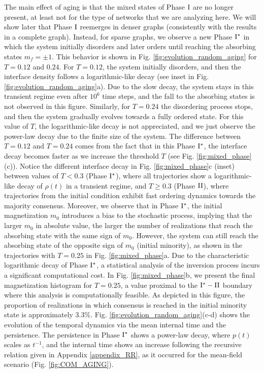 The main effect of aging is that the mixed states of Phase ${\rm I}$ are no longer present, at least not for the type of networks that we are analyzing here. We will show later that Phase ${\rm I}$ reemerges in denser graphs (consistently with the results in a complete graph). Instead, for sparse graphs, we observe a new Phase ${\rm I}^{*}$ in which the system initially disorders and later orders until reaching the absorbing states $m_f = \pm 1$. This behavior is shown in Fig. \ref{fig:evolution_random_aging} for $T = 0.12$ and $0.24$. For $T = 0.12$, the system initially disorders, and then the interface density follows a logarithmic-like decay (see inset in Fig. \ref{fig:evolution_random_aging}a). Due to the slow decay, the system stays in this transient regime even after $10^{6}$ time steps, and the fall to the absorbing states is not observed in this figure. Similarly, for $T = 0.24$ the disordering process stops, and then the system gradually evolves towards a fully ordered state. For this value of $T$, the logarithmic-like decay is not appreciated, and we just observe the power-law decay due to the finite size of the system. The difference between $T = 0.12$ and $T = 0.24$ comes from the fact that in this Phase ${\rm I}^{*}$, the interface decay becomes faster as we increase the threshold $T$ (see Fig. \ref{fig:mixed_phase}(c)). Notice the different interface decay in Fig. \ref{fig:mixed_phase}c (inset) between values of $T < 0.3$ (Phase ${\rm I}^{*}$), where all trajectories show a logarithmic-like decay of $\rho(t)$ in a transient regime, and $T \geq 0.3$ (Phase ${\rm II}$), where trajectories from the initial condition exhibit fast ordering dynamics towards the majority consensus. Moreover, we observe that in Phase ${\rm I}^{*}$, the initial magnetization $m_0$ introduces a bias to the stochastic process, implying that the larger $m_0$ in absolute value, the larger the number of realizations that reach the absorbing state with the same sign of $m_0$. However, the system can still reach the absorbing state of the opposite sign of $m_0$ (initial minority), as shown in the trajectories with $T = 0.25$ in Fig. \ref{fig:mixed_phase}a. Due to the characteristic logarithmic decay of Phase ${\rm I}^{*}$, a statistical analysis of the inversion process incurs a significant computational cost. In Fig. \ref{fig:mixed_phase}b, we present the final magnetization histogram for $T=0.25$, a value proximal to the ${\rm I}^{*} - {\rm II}$ boundary where this analysis is computationally feasible. As depicted in this figure, the proportion of realizations in which consensus is reached in the initial minority state is approximately $3.3\%$. Fig. \ref{fig:evolution_random_aging}(c-d) shows the evolution of the temporal dynamics via the mean internal time and the persistence. The persistence in Phase ${\rm I}^{*}$ shows a power-law decay, where $p(t)$ scales as $t^{-1}$, and the internal time shows an increase following the recursive relation given in Appendix \ref{appendix_RR}, as it occurred for the mean-field scenario (Fig. \ref{fig:COM_AGING}).


